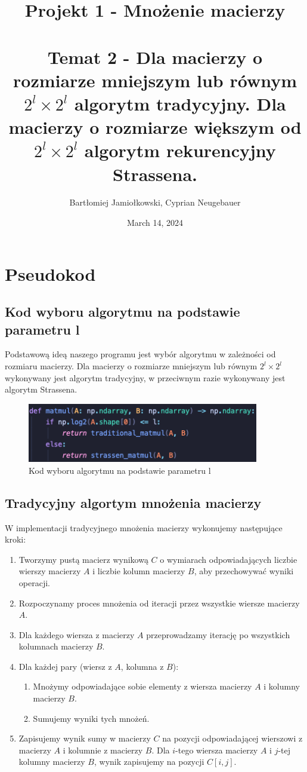 \documentclass{article}
\title{
  \huge \textbf{Projekt 1 - Mnożenie macierzy}\\~\\
  \LARGE Temat 2 - Dla macierzy o rozmiarze mniejszym lub równym $2^l \times 2^l$ algorytm tradycyjny. Dla macierzy o
rozmiarze większym od $2^l \times 2^l$ algorytm rekurencyjny Strassena.}
\author{Bartłomiej Jamiołkowski, Cyprian Neugebauer}
\date{March 14, 2024}
\begin{document}
\maketitle

\section{Pseudokod}

\subsection{Kod wyboru algorytmu na podstawie parametru l}
Podstawową ideą naszego programu jest wybór algorytmu w zależności od rozmiaru macierzy. Dla macierzy o rozmiarze
mniejszym lub równym $2^l \times 2^l$ wykonywany jest algorytm tradycyjny, w przeciwnym
razie wykonywany jest algorytm Strassena.

\begin{figure}[h]
  \centering
  \includegraphics[width=0.9\textwidth]{matmul.png}
  \caption{Kod wyboru algorytmu na podstawie parametru l}
\end{figure}
\newpage

\subsection{Tradycyjny algortym mnożenia macierzy}

W implementacji tradycyjnego mnożenia macierzy wykonujemy następujące kroki:
\begin{enumerate}
    \item Tworzymy pustą macierz wynikową $C$ o wymiarach odpowiadających liczbie wierszy macierzy $A$ i liczbie kolumn macierzy $B$, aby przechowywać wyniki operacji.
    \item Rozpoczynamy proces mnożenia od iteracji przez wszystkie wiersze macierzy $A$. 
    \item Dla każdego wiersza z macierzy $A$ przeprowadzamy iterację po wszystkich kolumnach macierzy $B$.
    \item Dla każdej pary (wiersz z $A$, kolumna z $B$):
    \begin{enumerate}
        \item Mnożymy odpowiadające sobie elementy z wiersza macierzy $A$ i kolumny macierzy $B$.
        \item Sumujemy wyniki tych mnożeń.
    \end{enumerate}
    \item Zapisujemy wynik sumy w macierzy $C$ na pozycji odpowiadającej wierszowi z macierzy $A$ i kolumnie z macierzy $B$. Dla $i$-tego wiersza macierzy $A$ i $j$-tej kolumny macierzy $B$, wynik zapisujemy na pozycji $C[i, j]$.
\end{enumerate}
\end{document}
